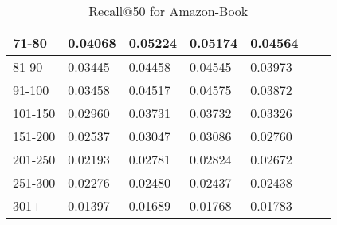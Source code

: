 \begin{table*}[]
\begin{tabular}{|l|l|l|l|l|l|l|}
        71-80     & 0.04068                        & 0.05224                        & 0.05174                        & 0.04564                        &                                &                                \\ \hline
        81-90     & 0.03445                        & 0.04458                        & 0.04545                        & 0.03973                        &                                &                                \\ \hline
        91-100    & 0.03458                        & 0.04517                        & 0.04575                        & 0.03872                        &                                &                                \\ \hline
        101-150   & 0.02960                        & 0.03731                        & 0.03732                        & 0.03326                        &                                &                                \\ \hline
        151-200   & 0.02537                        & 0.03047                        & 0.03086                        & 0.02760                        &                                &                                \\ \hline
        201-250   & 0.02193                        & 0.02781                        & 0.02824                        & 0.02672                        &                                &                                \\ \hline
        251-300   & 0.02276                        & 0.02480                        & 0.02437                        & 0.02438                        &                                &                                \\ \hline
        301+      & 0.01397                        & 0.01689                        & 0.01768                        & 0.01783                        &                                &                                \\ \hline
    \end{tabular}
    \caption{Recall@50 for Amazon-Book}
\end{table*}